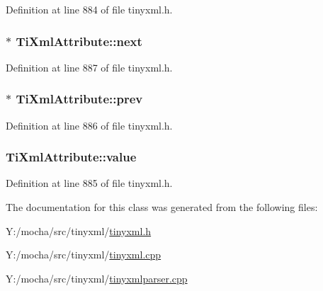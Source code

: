 Definition at line 884 of file tinyxml.h.

\hypertarget{class_ti_xml_attribute_ae851adf61b80cf45b797fee77dea135f}{
\subsubsection[{next}]{$\ast$ {\bf TiXmlAttribute::next}}}
\label{class_ti_xml_attribute_ae851adf61b80cf45b797fee77dea135f}


Definition at line 887 of file tinyxml.h.

\hypertarget{class_ti_xml_attribute_aaf6c6272c625fbf38e571cbf570ea94a}{
\subsubsection[{prev}]{$\ast$ {\bf TiXmlAttribute::prev}}}
\label{class_ti_xml_attribute_aaf6c6272c625fbf38e571cbf570ea94a}


Definition at line 886 of file tinyxml.h.

\hypertarget{class_ti_xml_attribute_ad0e2c2e8eb982d30cb6a89df79b2bb7b}{
\subsubsection[{value}]{ {\bf TiXmlAttribute::value}}}
\label{class_ti_xml_attribute_ad0e2c2e8eb982d30cb6a89df79b2bb7b}


Definition at line 885 of file tinyxml.h.



The documentation for this class was generated from the following files:\begin{DoxyCompactItemize}
\item 
Y:/mocha/src/tinyxml/\hyperlink{tinyxml_8h}{tinyxml.h}\item 
Y:/mocha/src/tinyxml/\hyperlink{tinyxml_8cpp}{tinyxml.cpp}\item 
Y:/mocha/src/tinyxml/\hyperlink{tinyxmlparser_8cpp}{tinyxmlparser.cpp}\end{DoxyCompactItemize}
